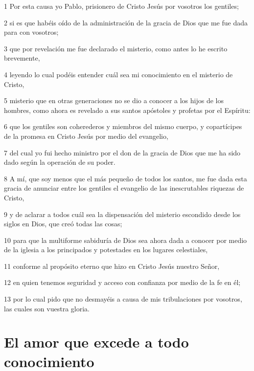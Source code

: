 \par 1 Por esta causa yo Pablo, prisionero de Cristo Jesús por vosotros los gentiles;
\par 2 si es que habéis oído de la administración de la gracia de Dios que me fue dada para con vosotros;
\par 3 que por revelación me fue declarado el misterio, como antes lo he escrito brevemente,
\par 4 leyendo lo cual podéis entender cuál sea mi conocimiento en el misterio de Cristo,
\par 5 misterio que en otras generaciones no se dio a conocer a los hijos de los hombres, como ahora es revelado a sus santos apóstoles y profetas por el Espíritu:
\par 6 que los gentiles son coherederos y miembros del mismo cuerpo, y copartícipes de la promesa en Cristo Jesús por medio del evangelio,
\par 7 del cual yo fui hecho ministro por el don de la gracia de Dios que me ha sido dado según la operación de su poder.
\par 8 A mí, que soy menos que el más pequeño de todos los santos, me fue dada esta gracia de anunciar entre los gentiles el evangelio de las inescrutables riquezas de Cristo,
\par 9 y de aclarar a todos cuál sea la dispensación del misterio escondido desde los siglos en Dios, que creó todas las cosas;
\par 10 para que la multiforme sabiduría de Dios sea ahora dada a conocer por medio de la iglesia a los principados y potestades en los lugares celestiales,
\par 11 conforme al propósito eterno que hizo en Cristo Jesús nuestro Señor,
\par 12 en quien tenemos seguridad y acceso con confianza por medio de la fe en él;
\par 13 por lo cual pido que no desmayéis a causa de mis tribulaciones por vosotros, las cuales son vuestra gloria.

\section*{El amor que excede a todo conocimiento}

